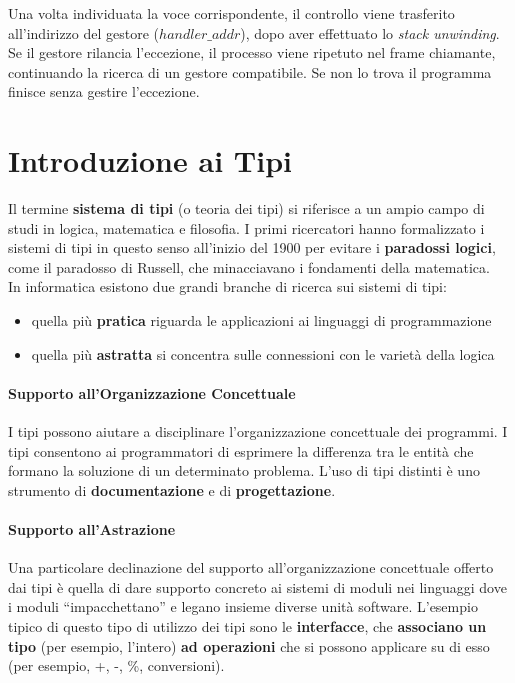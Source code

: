 \documentclass[a4paper,12pt]{article}
\begin{document}
Una volta individuata la voce corrispondente, il controllo viene trasferito
all’indirizzo del gestore ($\mathit{handler\_addr}$), dopo aver effettuato lo
\emph{stack unwinding}.
Se il gestore rilancia l’eccezione, il processo viene ripetuto nel frame
chiamante, continuando la ricerca di un gestore compatibile. Se non lo trova il programma finisce senza gestire l'eccezione.

\section{Introduzione ai Tipi}
Il termine \textbf{sistema di tipi} (o teoria dei tipi) si riferisce a un ampio campo di
studi in logica, matematica e filosofia. I primi ricercatori hanno formalizzato i
sistemi di tipi in questo senso all'inizio del 1900 per evitare i \textbf{paradossi logici},
come il paradosso di Russell, che minacciavano i fondamenti della matematica.\\
In informatica esistono due grandi branche di ricerca sui sistemi di tipi:
\begin{itemize}
  \item quella più \textbf{pratica} riguarda le applicazioni ai linguaggi di programmazione
  \item quella più \textbf{astratta} si concentra sulle connessioni con le varietà della logica
\end{itemize}
\paragraph{Supporto all’Organizzazione Concettuale} I tipi possono aiutare a disciplinare l'organizzazione concettuale dei programmi. I tipi consentono ai programmatori di esprimere la differenza tra le entità che formano
la soluzione di un determinato problema. L'uso di tipi distinti è uno strumento di \textbf{documentazione} e di \textbf{progettazione}.
\paragraph{Supporto all’Astrazione} Una particolare declinazione del supporto all'organizzazione concettuale offerto
dai tipi è quella di dare supporto concreto ai sistemi di moduli nei linguaggi dove i moduli “impacchettano” e legano insieme diverse unità software. L'esempio tipico di questo tipo di utilizzo dei tipi sono le \textbf{interfacce}, che
\textbf{associano un tipo} (per esempio, l'intero) \textbf{ad operazioni} che si possono applicare
su di esso (per esempio, +, -, \%, conversioni). 
\end{document}
